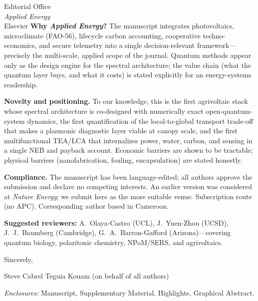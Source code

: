 \documentclass[10pt]{letter}
\begin{document}
\begin{letter}{Editorial Office\\
\textit{Applied Energy}\\
Elsevier}
\noindent\textbf{Why \textit{Applied Energy}?}
The manuscript integrates photovoltaics, microclimate (FAO-56), lifecycle carbon accounting, cooperative techno-economics, and secure telemetry into a single decision-relevant framework---precisely the multi-scale, applied scope of the journal. Quantum methods appear only as the design engine for the spectral architecture; the value chain (what the quantum layer buys, and what it costs) is stated explicitly for an energy-systems readership.

\noindent\textbf{Novelty and positioning.}
To our knowledge, this is the first agrivoltaic stack whose spectral architecture is co-designed with numerically exact open-quantum-system dynamics, the first quantification of the local-to-global transport trade-off that makes a plasmonic diagnostic layer viable at canopy scale, and the first multifunctional TEA/LCA that internalizes power, water, carbon, and sensing in a single NEB and payback account. Economic barriers are shown to be tractable; physical barriers (nanofabrication, fouling, encapsulation) are stated honestly.

\noindent\textbf{Compliance.}
The manuscript has been language-edited; all authors approve the submission and declare no competing interests. An earlier version was considered at \textit{Nature Energy}; we submit here as the more suitable venue. Subscription route (no APC). Corresponding author based in Cameroon.

\noindent\textbf{Suggested reviewers:} A.~Olaya-Castro (UCL), J.~Yuen-Zhou (UCSD), J.~J.~Baumberg (Cambridge), G.~A.~Barron-Gafford (Arizona)---covering quantum biology, polaritonic chemistry, NPoM/SERS, and agrivoltaics.

\medskip
Sincerely,

Steve Cabrel Teguia Kouam (on behalf of all authors)

\vspace{-0.6em}
\textit{Enclosures:} Manuscript, Supplementary Material, Highlights, Graphical Abstract.

\end{letter}
\end{document}
